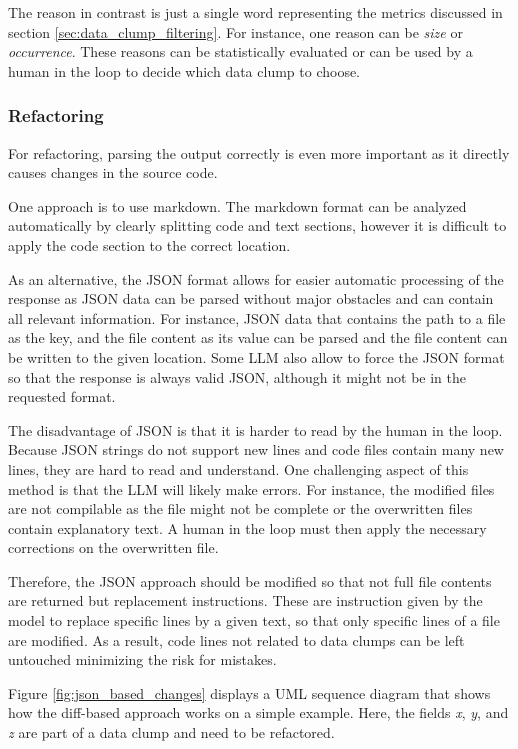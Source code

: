  The reason in contrast is just a single word representing the metrics discussed in section \ref{sec:data_clump_filtering}. For instance, one reason can be \textit{size} or \textit{occurrence}. These reasons can be statistically evaluated or can be used by a human in the loop to decide which data clump to choose. 

\subsubsection{Refactoring}
For refactoring, parsing the output correctly is even more important as it directly causes changes in the source code.

One approach is to use markdown. The markdown format can be analyzed automatically by clearly splitting code and text sections, however it is difficult to apply the code section to the correct location. 

As an alternative, the \ac{JSON} format allows for easier automatic processing of the response as \ac{JSON} data can be parsed without major obstacles and can contain all relevant information. For instance, \ac{JSON} data that contains the path to a file as the key, and the file content as its value can be parsed and the file content can be written to the given location. Some \acs{LLM} also allow to force the \ac{JSON} format so that the response is always valid \ac{JSON}, although it might not be in the requested format. 

The disadvantage of \ac{JSON} is that it is harder to read by the human in the loop. Because JSON strings do not support new lines and code files contain many new lines, they are hard to read and understand.
One challenging aspect of this method is that the \ac{LLM} will likely make errors. For instance, the modified files are not compilable as the file might not be complete or the  overwritten files contain explanatory text. A human in the loop must then apply the necessary corrections on the overwritten file.



Therefore, the \ac{JSON} approach should be modified so that not full file contents are returned but replacement instructions. These are instruction given by the model to replace specific lines by a given text, so that only specific lines of a file are modified.  As a result, code lines not related to data clumps can be left untouched minimizing the risk for mistakes. 


Figure \ref{fig:json_based_changes} displays a \ac{UML} sequence diagram that shows how the diff-based approach works on a simple example. Here, the fields \textit{x}, \textit{y}, and \textit{z} are part of a data clump and need to be refactored. 

